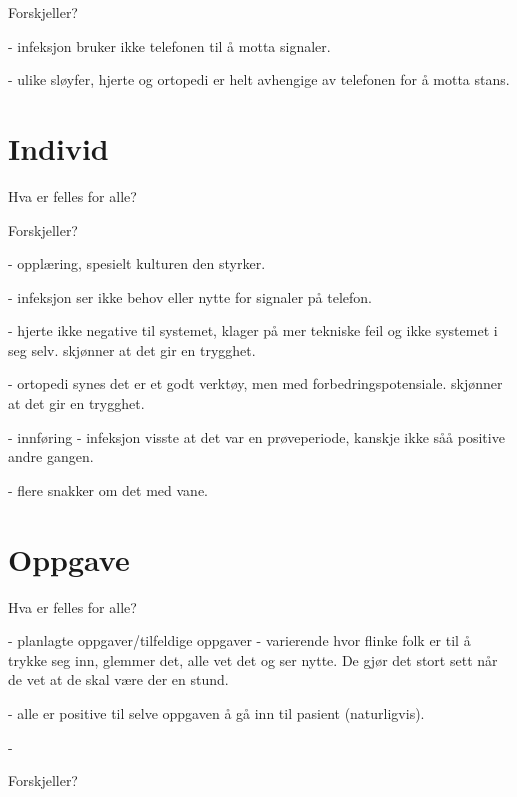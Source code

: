 Forskjeller?

- infeksjon bruker ikke telefonen til å motta signaler.

- ulike sløyfer, hjerte og ortopedi er helt avhengige av telefonen for å motta stans.

\section{Individ}
Hva er felles for alle?

Forskjeller?

- opplæring, spesielt kulturen den styrker.

- infeksjon ser ikke behov eller nytte for signaler på telefon.

- hjerte ikke negative til systemet, klager på mer tekniske feil og ikke systemet i seg selv. skjønner at det gir en trygghet.

- ortopedi synes det er et godt verktøy, men med forbedringspotensiale. skjønner at det gir en trygghet.

- innføring - infeksjon visste at det var en prøveperiode, kanskje ikke såå positive andre gangen.

- flere snakker om det med vane.

\section{Oppgave}
Hva er felles for alle?

- planlagte oppgaver/tilfeldige oppgaver
- varierende hvor flinke folk er til å trykke seg inn, glemmer det, alle vet det og ser nytte. De gjør det stort sett når de vet at de skal være der en stund.

- alle er positive til selve oppgaven å gå inn til pasient (naturligvis). 



- 

Forskjeller?
 



